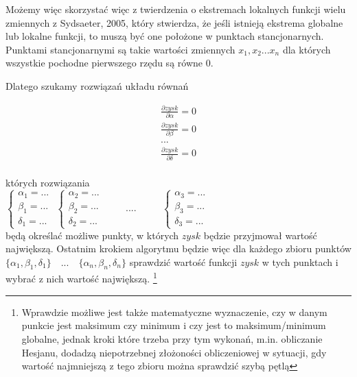 \documentclass{article}
\begin{document}
Możemy więc skorzystać  więc z twierdzenia o ekstremach lokalnych funkcji wielu zmiennych z Sydsaeter, 2005, który stwierdza, że jeśli istnieją ekstrema globalne  lub lokalne funkcji, to muszą być one położone w punktach stancjonarnych.  Punktami stancjonarnymi są takie wartości zmiennych ${x_1,x_2...x_n}$ dla których wszystkie pochodne pierwszego rzędu są równe 0. 

Dlatego szukamy rozwiązań układu równań

\begin{align*} 
 \frac{\partial zysk}{\partial \alpha} = 0 \\
\frac{\partial zysk}{\partial \beta} = 0 \\
...\\
\frac{\partial zysk}{\partial \delta} = 0 \\
\end{align*} 

których rozwiązania \\

$\begin{cases} \alpha_1=... \\ \beta_1=...  \\ \delta_1=... \end{cases}	$ $\begin{cases} \alpha_2=... \\ \beta_2=...  \\ \delta_2=... \end{cases}	$  $\qquad $.... $\qquad $ $\begin{cases} \alpha_3=... \\ \beta_3=...  \\ \delta_3=... \end{cases}	$   \\

będą określać możliwe punkty, w których $zysk$ będzie przyjmował wartość największą. Ostatnim krokiem algorytmu będzie więc dla każdego zbioru punktów $\{\alpha_1,\beta_1,\delta_1\} \quad ... \quad \{\alpha_n,\beta_n,\delta_n\}$ sprawdzić wartość funkcji $zysk$ w tych punktach i wybrać z nich wartość największą. \footnote{Wprawdzie możliwe jest także matematyczne wyznaczenie, czy w danym punkcie jest maksimum czy minimum i czy jest to maksimum/minimum globalne, jednak kroki które trzeba przy tym wykonań, m.in. obliczanie Hesjanu, dodadzą niepotrzebnej złożoności obliczeniowej w sytuacji, gdy wartość najmniejszą z tego zbioru można sprawdzić szybą pętlą}

\newpage
\end{document}
